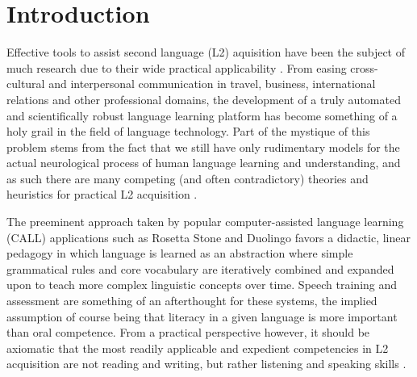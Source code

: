 \section{Introduction}
Effective tools to assist second language (L2) aquisition have been the subject of much research due to their wide practical applicability \cite{higgins1983computer} \cite{levy1997computer} \cite{hubbard2008call}. From easing cross-cultural and interpersonal communication in travel, business, international relations and other professional domains, the development of a truly automated and scientifically robust language learning platform has become something of a holy grail in the field of language technology. Part of the mystique of this problem stems from the fact that we still have only rudimentary models for the actual neurological process of human language learning and understanding, and as such there are many competing (and often contradictory) theories and heuristics for practical L2 acquisition \cite{pedersenfar} \cite{mitchell2013second}. 

The preeminent approach taken by popular computer-assisted language learning (CALL) applications such as Rosetta Stone \cite{vesselinov2009measuring} and Duolingo \cite{vesselinov2012duolingo} \cite{von2013duolingo} favors a didactic, linear pedagogy in which language is learned as an abstraction where simple grammatical rules and core vocabulary are iteratively combined and expanded upon to teach more complex linguistic concepts over time. Speech training and assessment are something of an afterthought for these systems, the implied assumption of course being that literacy in a given language is more important than oral competence. From a practical perspective however, it should be axiomatic that the most readily applicable and expedient competencies in L2 acquisition are not reading and writing, but rather listening and speaking skills \cite{brown1996performance} \cite{renukadevirole} \cite{feyten1991power} \cite{nunan2002listening} \cite{ferris1996academic}.

